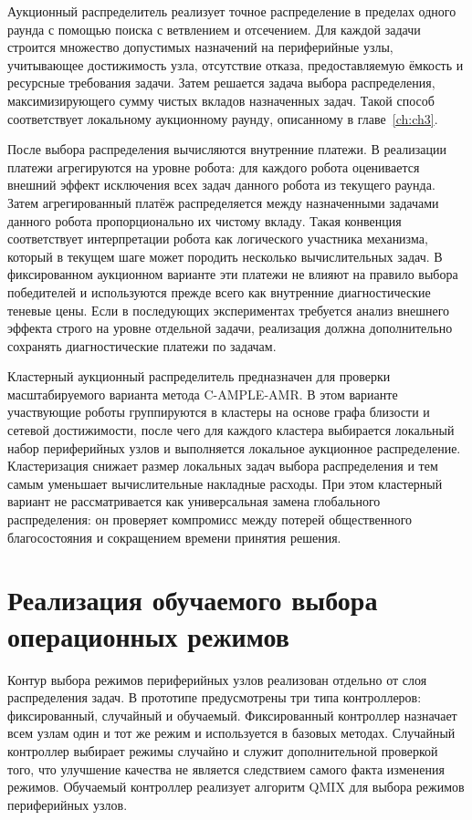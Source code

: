 Аукционный распределитель реализует точное распределение в пределах одного раунда с помощью поиска с ветвлением и отсечением. Для каждой задачи строится множество допустимых назначений на периферийные узлы, учитывающее достижимость узла, отсутствие отказа, предоставляемую ёмкость и ресурсные требования задачи. Затем решается задача выбора распределения, максимизирующего сумму чистых вкладов назначенных задач. Такой способ соответствует локальному аукционному раунду, описанному в главе~\ref{ch:ch3}.

После выбора распределения вычисляются внутренние платежи. В реализации платежи агрегируются на уровне робота: для каждого робота оценивается внешний эффект исключения всех задач данного робота из текущего раунда. Затем агрегированный платёж распределяется между назначенными задачами данного робота пропорционально их чистому вкладу. Такая конвенция соответствует интерпретации робота как логического участника механизма, который в текущем шаге может породить несколько вычислительных задач. В фиксированном аукционном варианте эти платежи не влияют на правило выбора победителей и используются прежде всего как внутренние диагностические теневые цены. Если в последующих экспериментах требуется анализ внешнего эффекта строго на уровне отдельной задачи, реализация должна дополнительно сохранять диагностические платежи по задачам.

Кластерный аукционный распределитель предназначен для проверки масштабируемого варианта метода C-AMPLE-AMR. В этом варианте участвующие роботы группируются в кластеры на основе графа близости и сетевой достижимости, после чего для каждого кластера выбирается локальный набор периферийных узлов и выполняется локальное аукционное распределение. Кластеризация снижает размер локальных задач выбора распределения и тем самым уменьшает вычислительные накладные расходы. При этом кластерный вариант не рассматривается как универсальная замена глобального распределения: он проверяет компромисс между потерей общественного благосостояния и сокращением времени принятия решения.

\section{Реализация обучаемого выбора операционных режимов}

Контур выбора режимов периферийных узлов реализован отдельно от слоя распределения задач. В прототипе предусмотрены три типа контроллеров: фиксированный, случайный и обучаемый. Фиксированный контроллер назначает всем узлам один и тот же режим и используется в базовых методах. Случайный контроллер выбирает режимы случайно и служит дополнительной проверкой того, что улучшение качества не является следствием самого факта изменения режимов. Обучаемый контроллер реализует алгоритм QMIX для выбора режимов периферийных узлов.


